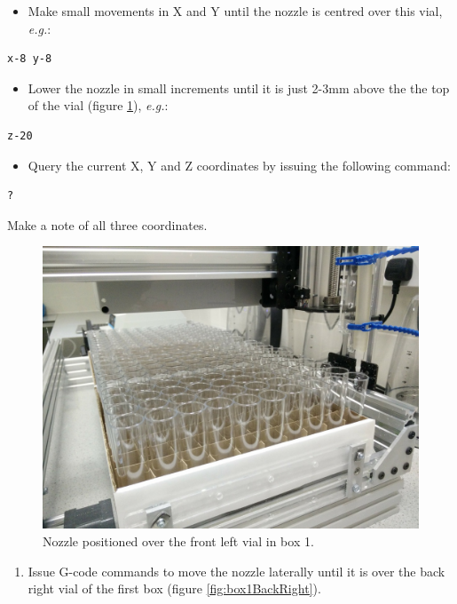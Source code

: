 \documentclass[
]{book}
\providecommand{\tightlist}{%
  \setlength{\itemsep}{0pt}\setlength{\parskip}{0pt}}
\begin{document}
\begin{itemize}
\tightlist
\item
  Make small movements in X and Y until the nozzle is centred over this vial, \emph{e.g.}:
\end{itemize}

\begin{verbatim}
x-8 y-8
\end{verbatim}

\begin{itemize}
\tightlist
\item
  Lower the nozzle in small increments until it is just 2-3mm above the the top of the vial (figure \ref{fig:box1FrontLeft}), \emph{e.g.}:
\end{itemize}

\begin{verbatim}
z-20
\end{verbatim}

\begin{itemize}
\tightlist
\item
  Query the current X, Y and Z coordinates by issuing the following command:
\end{itemize}

\begin{verbatim}
?
\end{verbatim}

Make a note of all three coordinates.

\begin{figure}

{\centering \includegraphics[width=0.5\linewidth]{images/box1_first_vial} 

}

\caption{Nozzle positioned over the front left vial in box 1.}\label{fig:box1FrontLeft}
\end{figure}

\begin{enumerate}
\def\labelenumi{\arabic{enumi}.}
\setcounter{enumi}{4}
\tightlist
\item
  Issue G-code commands to move the nozzle laterally until it is over the back right vial of the first box (figure \ref{fig:box1BackRight}).
\end{enumerate}
\end{document}
